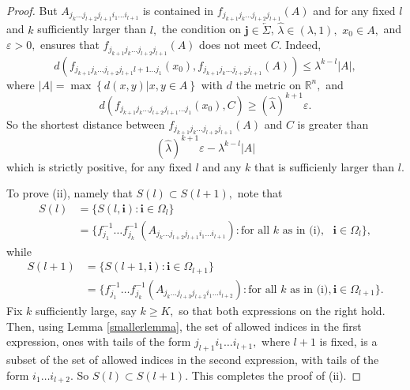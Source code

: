 \documentclass[10pt,a4paper]{amsart}
\begin{document}
\begin{proof}
But $A_{j_{k}\dots j_{l+2}j_{l+1}i_{1}\dots i_{l+1}}$ is contained in
$f_{j_{k+1}j_{k}\dots j_{l+2}j_{l+1}}(A)$ and for any fixed $l$ and $k$
sufficiently larger than $l,$ the condition on $\mathbf{j\in}%
\overleftarrow{\Sigma}$, $\widehat{\lambda}\in(\lambda,1),$ $x_{0}\in A,$ and
$\varepsilon>0,$ ensures that $f_{j_{k+1}j_{k}\dots j_{l+2}j_{l+1}}(A)$ does
not meet $C.$ Indeed,%
\begin{equation}
d(f_{j_{k+1}j_{k}\dots j_{l+2}j_{l+1}l+1\dots j_{1}}(x_{0}),f_{j_{k+1}%
j_{k}\dots j_{l+2}j_{l+1}}(A))\leq\lambda^{k-l}|A|, \label{estimate1}%
\end{equation}
where $\left\vert A\right\vert =\max\left\{  d(x,y)|x,y\in A\right\}  $ with
$d$ the metric on $\mathbb{R}^{n},$ and%
\begin{equation}
d(f_{j_{k+1}j_{k}\dots j_{l+2}j_{l+1}\dots j_{1}}(x_{0}),C)\geq\left(
\widehat{\lambda}\right)  ^{k+1}\varepsilon. \label{estimate2}%
\end{equation}
So the shortest distance between $f_{j_{k+1}j_{k}\dots j_{l+2}j_{l+1}}(A)$ and
$C$ is greater than
\begin{equation}
\left(  \widehat{\lambda}\right)  ^{k+1}\varepsilon-\lambda^{k-l}|A|
\label{ineq}%
\end{equation}
which is strictly positive, for any fixed $l$ and any $k$ that is sufficienly
larger than $l.$

To prove (ii), namely that $S(l)\subset S(l+1),$ note that
\begin{align*}
S(l)  &  =\{S(l,\mathbf{i}):\mathbf{i}\in\Omega_{l}\}\\
&  =\{f_{j_{1}}^{-1}\dots f_{j_{k}}^{-1}(A_{j_{k}\dots j_{l+2}j_{l+1}%
i_{1}\dots i_{l+1}}):\text{for all }k\text{ as in (i)},\text{ }\mathbf{i}%
\in\Omega_{l}\},
\end{align*}
while
\begin{align*}
S(l+1)  &  =\{S(l+1,\mathbf{i}):\mathbf{i}\in\Omega_{l+1}\}\\
&  =\{f_{j_{1}}^{-1}\dots f_{j_{k}}^{-1}(A_{j_{k}\dots j_{l+3}j_{l+2}%
i_{1}\dots i_{l+2}}):\text{for all }k\text{ as in (i)},\mathbf{i}\in
\Omega_{l+1}\}.
\end{align*}
Fix $k$ sufficiently large, say $k\geq K,$ so that both expressions on the
right hold. Then, using Lemma \ref{smallerlemma}, the set of allowed indices
in the first expression, ones with tails of the form $j_{l+1}i_{1}\dots
i_{l+1},$ where $l+1$ is fixed, is a subset of the set of allowed indices in
the second expression, with tails of the form $i_{1}\dots i_{l+2}$. So
$S(l)\subset S(l+1)$. This completes the proof of (ii).


\end{proof}
\end{document}
